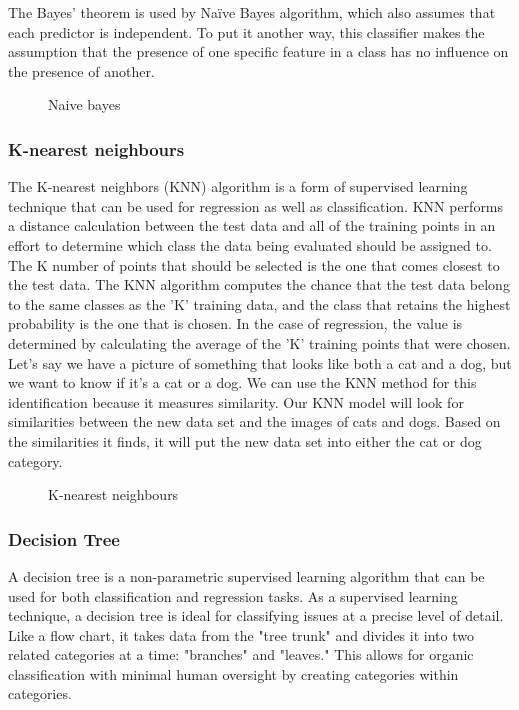 The Bayes' theorem is used by Naïve Bayes algorithm, which also assumes that each predictor is independent. To put it another way, this classifier makes the assumption that the presence of one specific feature in a class has no influence on the presence of another.

\begin{figure}[htb]
	\centering
	\caption{Naive bayes}
	\label{fig:nb}
\end{figure}


\subsubsection{K-nearest neighbours}
The K-nearest neighbors (KNN) algorithm is a form of supervised learning technique that can be used for regression as well as classification. KNN performs a distance calculation between the test data and all of the training points in an effort to determine which class the data being evaluated should be assigned to. The K number of points that should be selected is the one that comes closest to the test data. The KNN algorithm computes the chance that the test data belong to the same classes as the 'K' training data, and the class that retains the highest probability is the one that is chosen. In the case of regression, the value is determined by calculating the average of the 'K' training points that were chosen.
\\

Let's say we have a picture of something that looks like both a cat and a dog, but we want to know if it's a cat or a dog. We can use the KNN method for this identification because it measures similarity. Our KNN model will look for similarities between the new data set and the images of cats and dogs. Based on the similarities it finds, it will put the new data set into either the cat or dog category.

\begin{figure}[htb]
	\centering
	\caption{K-nearest neighbours}
	\label{fig:knn}
\end{figure}

\subsubsection{Decision Tree}
A decision tree is a non-parametric supervised learning algorithm that can be used for both classification and regression tasks. As a supervised learning technique, a decision tree is ideal for classifying issues at a precise level of detail. Like a flow chart, it takes data from the "tree trunk" and divides it into two related categories at a time: "branches" and "leaves." This allows for organic classification with minimal human oversight by creating categories within categories.

